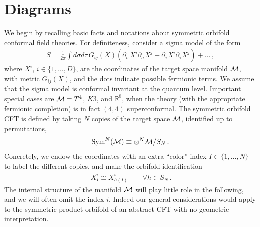 \documentclass[letterpaper]{JHEP3}
\def\d{\partial}
\def\s{\sigma}
\def\be{\begin{equation}}
\def\ee{\end{equation}}
\def\d{{\partial}}
\def\be{\begin{eqnarray}}
\def\ee{\end{eqnarray}}
\def\d{\partial}
\begin{document}
\section{Diagrams}\label{symmprodCFT}
	

We begin by recalling basic facts and notations about symmetric orbifold conformal field theories.
For definiteness, consider a sigma model of the form
\be\label{bosaction}
S=\frac{1}{2\pi}\int d\s d\tau\,  G_{ij} (X) \left(\d_\s X^i \d_\s X^j -\d_\tau X^i \d_\tau X^j\right) + \dots \, ,
\ee
where $X^i$, $i\in \{ 1,\dots, D \}$, are the coordinates of the target space manifold ${\cal M}$, with metric $G_{ij}(X)$,
and the dots indicate possible fermionic terms.
We assume that the sigma model is conformal invariant at the quantum level. Important special cases are
 ${\cal M} = T^4$, $K3$, and $\mathbb{R}^8$, when the theory (with the appropriate fermionic completion) is in fact $(4, 4)$ superconformal.
The symmetric orbifold CFT   is defined by
 taking $N$ copies of the target space ${\cal M}$,  identified up to permutations,
\be
{\rm Sym}^N({\cal M}) \equiv \otimes^N {\cal M} / {S_N} \, .
\ee
Concretely, we endow the coordinates
with an extra ``color'' index    $I\in \{1,\dots, N \}$ to label the different  {copies}, and
 make the orbifold  identification
\be\label{inv}
\, X^i_I \cong X^i_{h(I)} \qquad \forall h\in S_N \,.
\ee
 The internal structure of the manifold ${\cal M}$ will play little role in the following,
and we will often omit the index $i$. Indeed  our general considerations would apply  to the symmetric
product orbifold of an abstract CFT with no geometric interpretation.
\end{document}
